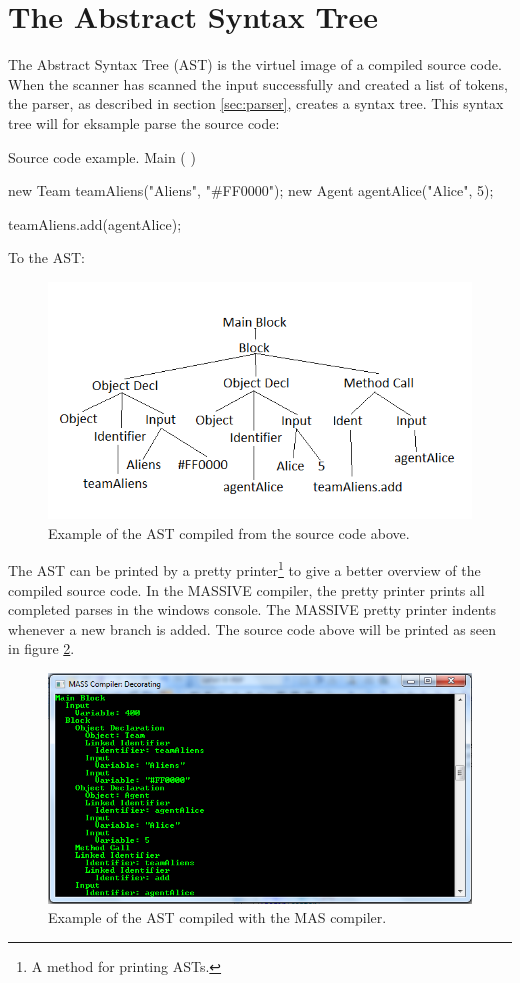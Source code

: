 \section{The Abstract Syntax Tree}
\label{AST}
The Abstract Syntax Tree (AST) is the virtuel image of a compiled source code. When the scanner has scanned the input successfully and created a list of tokens, the parser, as described in section \ref{sec:parser}, creates a syntax tree. This syntax tree will for eksample parse the source code:

\begin{source}{Source code example.}{}
Main (  )
{	
	new Team teamAliens("Aliens", "#FF0000");
	new Agent agentAlice("Alice", 5);
	
	teamAliens.add(agentAlice);	
}
\end{source} 

To the AST:

\begin{figure}[H]
\begin{center}
\includegraphics[scale=0.8]{Images/ASTexample.png}
\end{center}
\caption{Example of the AST compiled from the source code above.}
\label{fig:astexample}
\end{figure}

The AST can be printed by a pretty printer\footnote{A method for printing ASTs.} to give a better overview of the compiled source code. In the MASSIVE compiler, the pretty printer prints all completed parses in the windows console. The MASSIVE pretty printer indents whenever a new branch is added. The source code above will be printed as seen in figure \ref{fig:astmasexample}.

\begin{figure}[H]
\begin{center}
\includegraphics[scale=0.7]{Images/ASTMASexample.png}
\end{center}
\caption{Example of the AST compiled with the MAS compiler.}
\label{fig:astmasexample}
\end{figure}